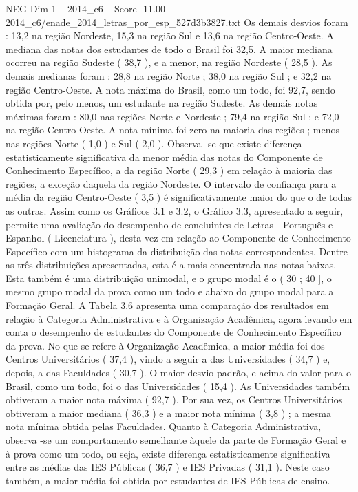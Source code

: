 \begin{textsample}{NEG Dim 1 – 2014\_c6 – Score -11.00 – 2014\_c6/enade\_2014\_letras\_por\_esp\_527d3b3827.txt}
Os demais desvios foram : 13,2 na região Nordeste, 15,3 na região Sul e 13,6 na região Centro-Oeste.
A mediana das notas dos estudantes de todo o Brasil foi 32,5.
A maior mediana ocorreu na região Sudeste ( 38,7 ), e a menor, na região Nordeste ( 28,5 ).
As demais medianas foram : 28,8 na região Norte ; 38,0 na região Sul ; e 32,2 na região Centro-Oeste.
A nota máxima do Brasil, como um todo, foi 92,7, sendo obtida por, pelo menos, um estudante na região Sudeste.
As demais notas máximas foram : 80,0 nas regiões Norte e Nordeste ; 79,4 na região Sul ; e 72,0 na região Centro-Oeste.
A nota mínima foi zero na maioria das regiões ; menos nas regiões Norte ( 1,0 ) e Sul ( 2,0 ).
Observa -se que existe diferença estatisticamente significativa da menor média das notas do Componente de Conhecimento Específico, a da região Norte ( 29,3 ) em relação à maioria das regiões, a exceção daquela da região Nordeste.
O intervalo de confiança para a média da região Centro-Oeste ( 3,5 ) é significativamente maior do que o de todas as outras.
Assim como os Gráficos 3.1 e 3.2, o Gráfico 3.3, apresentado a seguir, permite uma avaliação do desempenho de concluintes de Letras - Português e Espanhol ( Licenciatura ), desta vez em relação ao Componente de Conhecimento Específico com um histograma da distribuição das notas correspondentes.
Dentre as três distribuições apresentadas, esta é a mais concentrada nas notas baixas.
Esta também é uma distribuição unimodal, e o grupo modal é o ( 30 ; 40 ], o mesmo grupo modal da prova como um todo e abaixo do grupo modal para a Formação Geral.
A Tabela 3.6 apresenta uma comparação dos resultados em relação à Categoria Administrativa e à Organização Acadêmica, agora levando em conta o desempenho de estudantes do Componente de Conhecimento Específico da prova.
No que se refere à Organização Acadêmica, a maior média foi dos Centros Universitários ( 37,4 ), vindo a seguir a das Universidades ( 34,7 ) e, depois, a das Faculdades ( 30,7 ).
O maior desvio padrão, e acima do valor para o Brasil, como um todo, foi o das Universidades ( 15,4 ).
As Universidades também obtiveram a maior nota máxima ( 92,7 ).
Por sua vez, os Centros Universitários obtiveram a maior mediana ( 36,3 ) e a maior nota mínima ( 3,8 ) ; a mesma nota mínima obtida pelas Faculdades.
Quanto à Categoria Administrativa, observa -se um comportamento semelhante àquele da parte de Formação Geral e à prova como um todo, ou seja, existe diferença estatisticamente significativa entre as médias das IES Públicas ( 36,7 ) e IES Privadas ( 31,1 ).
Neste caso também, a maior média foi obtida por estudantes de IES Públicas de ensino.

\end{textsample}
